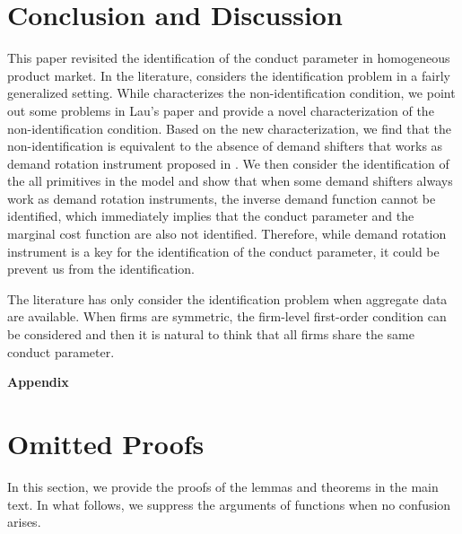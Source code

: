\documentclass[11pt, a4paper]{article}
\theoremstyle{remark}
\newcommand{\appendixsection}{%
  \setcounter{section}{0}%
  \renewcommand{\thesection}{\Alph{section}}%
  \renewcommand{\thetheorem}{\Alph{section}.\arabic{theorem}}%
  \renewcommand{\thelemma}{\Alph{section}.\arabic{lemma}}%
  \renewcommand{\theproposition}{\Alph{section}.\arabic{proposition}}%
  \renewcommand{\thecorollary}{\Alph{section}.\arabic{corollary}}%
  \renewcommand{\thedefinition}{\Alph{section}.\arabic{definition}}%
}
\begin{document}
\section{Conclusion and Discussion}

This paper revisited the identification of the conduct parameter in homogeneous product market.
In the literature, \citet{lau1982identifying} considers the identification problem in a fairly generalized setting.
While \citet{lau1982identifying} characterizes the non-identification condition, we point out some problems in Lau's paper and provide a novel characterization of the non-identification condition.
Based on the new characterization, we find that the non-identification is equivalent to the absence of demand shifters that works as demand rotation instrument proposed in \citet{bresnahan1982oligopoly}.
We then consider the identification of the all primitives in the model and show that when some demand shifters always work as demand rotation instruments, the inverse demand function cannot be identified, which immediately implies that the conduct parameter and the marginal cost function are also not identified.
Therefore, while demand rotation instrument is a key for the identification of the conduct parameter, it could be prevent us from the identification.



The literature has only consider the identification problem when aggregate data are available.
When firms are symmetric, the firm-level first-order condition can be considered and then it is natural to think that all firms share the same conduct parameter.








\newpage
\appendix
\appendixsection
{}

\begin{center}
\huge\textbf{Appendix}
\end{center}
\vspace{1mm}

\section{Omitted Proofs}\label{appendix:proof}
In this section, we provide the proofs of the lemmas and theorems in the main text.
In what follows, we suppress the arguments of functions when no confusion arises.
\end{document}
